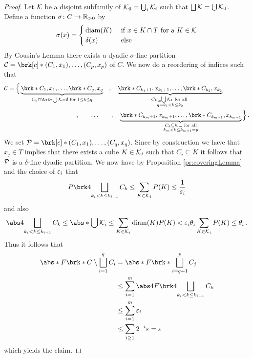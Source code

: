 \begin{proof}
Let $\mathcal{K}$ be a disjoint subfamily of $\mathcal{K}_0=\bigcup_i\mathcal{K}_i$ such that $\bigsqcup\mathcal{K}=\bigcup\mathcal{K}_0$. Define a function $\sigma\colon C\to \mathbb{R}_{>0}$ by
\begin{align*}
	\sigma(x)=\begin{cases}
		\operatorname{diam}(K)&\text{ if }x\in K\cap T\text{ for a }K\in\mathcal{K}\\
		\delta(x) &\text{ else}
	\end{cases}
\end{align*}
By Cousin's Lemma there exists a dyadic $\sigma$-fine partition $\cC=\brk[c]*{(C_1,x_1),\dots,(C_p,x_p)}$ of $C$.
 We now do a reordering of indices such that
\begin{align*}
	\cC=\Big\{\underbrace{\brk*{C_1,x_1},\dots,\brk*{C_q,x_q}}_{C_k\cap\brk*{\bigcup\cK}=\emptyset\text{ for }1\leq k\leq q}\quad,\quad \underbrace{\brk*{C_{k_1+1},x_{k_1+1}},\dots,\brk*{C_{k_2},x_{k_2}}}_{\substack{C_k\subseteq \bigcup\cK_1 \text{ for all } \\ q=k_1< k\leq k_2}}\qquad\qquad&\\
	\qquad\qquad,\qquad\dots\qquad,\quad \underbrace{\brk*{C_{k_m+1},x_{k_m+1}},\dots,\brk*{C_{k_{m+1}},x_{k_{m+1}}}}_{\substack{C_k\subseteq \cK_m \text{ for all}\\  k_m< k\leq k_{m+1}=p}}\Big\}&\,.
\end{align*}
We set $\cP=\brk[c]*{(C_1,x_1),\dots,(C_q,x_q)}$. Since by construction we have that $x_j\in T$ implies that there exists a cube $K\in\mathcal{K}_i$ such that $C_i\subseteq K$ it follows that $\mathcal{P}$ is a $\delta$-fine dyadic partition.
We now have by Proposition \ref{pr:coveringLemma} and the choice of $\varepsilon_i$ that
\begin{align*}
	P\brk4{\bigsqcup_{k_i<k\leq k_{i+1}}C_k}
	\leq \sum_{K\in\cK_i}P(K)
	\leq \frac{1}{\e_i}
\end{align*}
and also
\begin{align*}
	\abs4{\bigsqcup_{k_i<k\leq k_{i+1}}C_k}
	\leq \abs*{\bigcup\cK_i}
	\leq \sum_{K\in\cK_i}\diam(K)P(K)
	<\e_i\theta_i\sum_{K\in\cK_i}P(K)\leq \theta_i\,.
\end{align*}
Thus it follows that
\begin{align*}
	\abs*{F\brk*{C\setminus\bigsqcup_{i=1}^q C_i}}
	&=\abs*{F\brk*{\bigsqcup_{i=q+1}^p C_j}} \\
	&\leq \sum_{i=1}^m\abs4{F\brk4{\bigsqcup_{k_i<k\leq k_{i+1}}C_k}} \\
	&\leq \sum_{i=1}^m\e_i \\
	&\leq \sum_{i\geq 1}2^{-i}\e=\e
\end{align*}
which yields the claim.
\end{proof}

